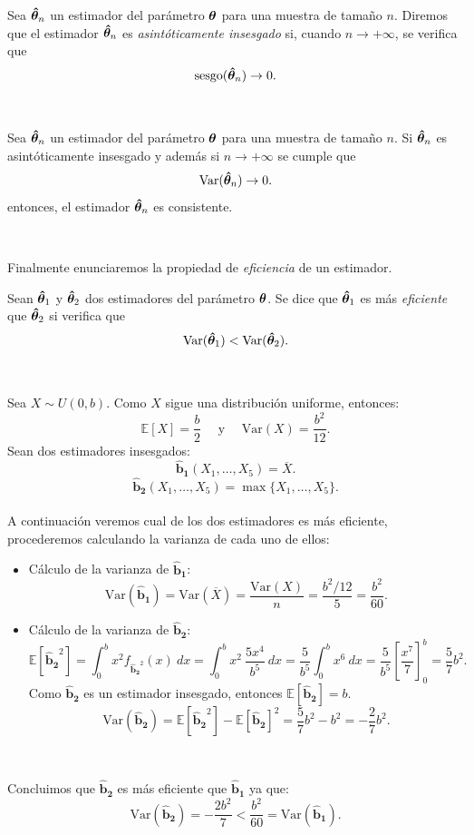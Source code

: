 \documentclass[oneside,openright,titlepage,numbers=noenddot,openany,headinclude,footinclude=true,
cleardoublepage=empty,abstractoff,BCOR=5mm,paper=a4,fontsize=12pt,main=spanish]{scrreprt}
\begin{document}
\begin{definition}
Sea $\bm{\hat{\theta}}_n$ un estimador del parámetro $\bm{\theta}$ para una muestra de tamaño $n$. Diremos que el estimador $\bm{\hat{\theta}}_n$ es \textit{asintóticamente insesgado} si, cuando $n\to +\infty$, se verifica que $$\text{sesgo}(\bm{\hat{\theta}}_n) \to 0.$$
\end{definition}\

\begin{corollary} \label{cor:lemaestima}
Sea $\bm{\hat{\theta}}_n$ un estimador del parámetro $\bm{\theta}$ para una muestra de tamaño $n$. Si $\bm{\hat{\theta}}_n$ es asintóticamente insesgado y además si $n\to +\infty$ se cumple que $$\text{Var}(\bm{\hat{\theta}}_n)\to 0.$$
entonces, el estimador $\bm{\hat{\theta}}_n$ es consistente.
\end{corollary}\

Finalmente enunciaremos la propiedad de \textit{eficiencia} de un estimador.\\

\begin{definition} \label{def:efvar}
Sean $\bm{\hat{\theta}}_1$ y $\bm{\hat{\theta}}_2$ dos estimadores del parámetro $\bm{\theta}$. Se dice que $\bm{\hat{\theta}}_1$ es más \textit{eficiente} que $\bm{\hat{\theta}}_2$ si verifica que $$\text{Var}(\bm{\hat{\theta}}_1)<\text{Var}(\bm{\hat{\theta}}_2).$$
\end{definition}\

\begin{example} \label{ex:eficienciaex}
Sea $X \sim U(0,b)$.
Como $X$ sigue una distribución uniforme, entonces: $$\mathbb{E}[X]=\frac{b}{2} \quad \text{ y } \quad \text{Var}(X)=\frac{b^2}{12}.$$
Sean dos estimadores insesgados:
$$\bm{\hat{b}_1}(X_1,\dots,X_{5})=\overline{X}.$$
$$\bm{\hat{b}_2}(X_1,\dots,X_{5})=\max \{X_1,\dots,X_5\}.$$\\
A continuación veremos cual de los dos estimadores es más eficiente, procederemos calculando la varianza de cada uno de ellos:\\

\begin{itemize}
    \item Cálculo de la varianza de $\bm{\hat{b}_1}$: $$\text{Var}(\bm{\hat{b}_1})=\text{Var}(\overline{X})=\frac{\text{Var}(X)}{n}=\frac{b^2/12}{5}=\frac{b^2}{60}.$$
    \item Cálculo de la varianza de $\bm{\hat{b}_2}$: $$\mathbb{E}\left[\bm{\hat{b}_2}^2\right]=\int_{0}^b x^2 f_{\bm{\hat{b}_2}^2}(x) \ dx=\int_{0}^b x^2 \ \frac{5x^4}{b^5} \ dx=\frac{5}{b^5}\int_{0}^b x^6 \ dx=\frac{5}{b^5}\left[\frac{x^7}{7}\right]_{0}^b=\frac{5}{7}b^2.$$
    Como $\bm{\hat{b}_2}$ es un estimador insesgado, entonces $\mathbb{E}[\bm{\hat{b}_2}]=b$.
    $$\text{Var}\left(\bm{\hat{b}_2}\right)=\mathbb{E}\left[\bm{\hat{b}_2}^2\right]-\mathbb{E}\left[\bm{\hat{b}_2}\right]^2=\frac{5}{7}b^2-b^2=-\frac{2}{7}b^2.$$
\end{itemize}\

Concluimos que $\bm{\hat{b}_2}$ es más eficiente que $\bm{\hat{b}_1}$ ya que: $$\text{Var}(\bm{\hat{b}_2})= -\frac{2b^2}{7} < \frac{b^2}{60}=\text{Var}(\bm{\hat{b}_1}).$$
\end{example}
\end{document}
